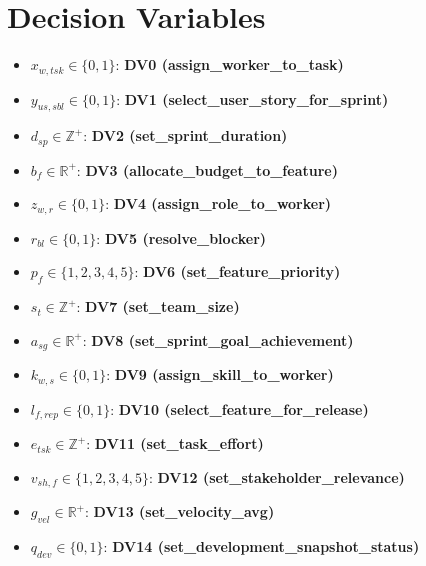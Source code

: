 \documentclass{article}
\begin{document}
\section{Decision Variables}
\begin{itemize}
    \item $x_{w,tsk} \in \{0,1\}$: \textbf{DV0 (assign\_worker\_to\_task)}
    \item $y_{us,sbl} \in \{0,1\}$: \textbf{DV1 (select\_user\_story\_for\_sprint)}
    \item $d_{sp} \in \mathbb{Z}^+$: \textbf{DV2 (set\_sprint\_duration)}
    \item $b_{f} \in \mathbb{R}^+$: \textbf{DV3 (allocate\_budget\_to\_feature)}
    \item $z_{w,r} \in \{0,1\}$: \textbf{DV4 (assign\_role\_to\_worker)}
    \item $r_{bl} \in \{0,1\}$: \textbf{DV5 (resolve\_blocker)}
    \item $p_f \in \{1,2,3,4,5\}$: \textbf{DV6 (set\_feature\_priority)}
    \item $s_t \in \mathbb{Z}^+$: \textbf{DV7 (set\_team\_size)}
    \item $a_{sg} \in \mathbb{R}^+$: \textbf{DV8 (set\_sprint\_goal\_achievement)}
    \item $k_{w,s} \in \{0,1\}$: \textbf{DV9 (assign\_skill\_to\_worker)}
    \item $l_{f,rep} \in \{0,1\}$: \textbf{DV10 (select\_feature\_for\_release)}
    \item $e_{tsk} \in \mathbb{Z}^+$: \textbf{DV11 (set\_task\_effort)}
    \item $v_{sh,f} \in \{1,2,3,4,5\}$: \textbf{DV12 (set\_stakeholder\_relevance)}
    \item $g_{vel} \in \mathbb{R}^+$: \textbf{DV13 (set\_velocity\_avg)}
    \item $q_{dev} \in \{0,1\}$: \textbf{DV14 (set\_development\_snapshot\_status)}
\end{itemize}
\end{document}
